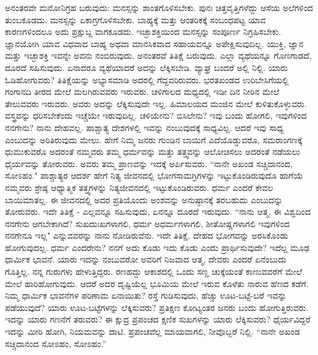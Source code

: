 ಅನಂತರವೇ ಮನೋನಿಗ್ರಹ ಬರುವುದು: ಮನಸ್ಸನ್ನು ಶಾಂತಗೊಳಿಸಬೇಕು. ಪುನಃ ಚಿತ್ತವೃತ್ತಿಗಳೆದ್ದು ಆಸೆಯ ಅಲೆಗಳಿಂದ ತುಂಬಕೂಡದು. ಮನಸ್ಸನ್ನು ಏಕಾಗ್ರಗೊಳಿಸಬೇಕು. ಬಾಹ್ಯಕ್ಕೆ ಮತ್ತು ಆಂತರಿಕಕ್ಕೆ ಸಂಬಂಧಪಟ್ಟ ಯಾವ ಕಾರಣಗಳಿಂದಲೂ ಅದು ಪ್ರಕ್ಷುಬ್ದ ವಾಗಕೂಡದು. ಇಚ್ಛಾಶಕ್ತಿಯಿಂದ ಮನಸ್ಸನ್ನು ಸಂಪೂರ್ಣ ನಿಗ್ರಹಿಸಬೇಕು. ಜ್ಞಾನಯೋಗಿ ಯಾವ ವಿಧವಾದ ಬಾಹ್ಯ ಅಥವಾ ಮಾನಸಿಕವಾದ ಸಹಾಯವನ್ನೂ ಅಪೇಕ್ಷಿಸುವುದಿಲ್ಲ. ಯುಕ್ತಿ, ಜ್ಞಾನ ಮತ್ತು ಇಚ್ಛಾಶಕ್ತಿ ಇವನ್ನೇ ಅವನು ನಂಬಿರುವುದು. ಅನಂತರವೆ ತಿತಿಕ್ಷೆ ಬರುವುದು. ಎಲ್ಲಾ ವ್ಯಥೆಯನ್ನೂ ಗೊಣಗಾಡದೆ, ದೂರದೆ ಸಹಿಸುವುದು. ಏನಾದರೂ ವ್ಯಥೆಯಾದರೆ ಅದನ್ನು ಲೆಕ್ಕಿಸಬೇಡಿ. ವ್ಯಾಘ್ರ ಬಂದರೆ ಅಲ್ಲಿ ನಿಲ್ಲಿ. ಯಾರು ಓಡಿಹೋಗುವರು? ತಿತಿಕ್ಷೆಯನ್ನು ಅಭ್ಯಾಸಮಾಡಿ ಅದರಲ್ಲಿ ಗೆದ್ದವರಿರುವರು. ಭರತಖಂಡದ ಉರಿಬೇಸಿಗೆಯಲ್ಲಿ ಗಂಗಾನದಿ ತೀರದ ಮೇಲೆ ಮಲಗಿರುವವರು ಇರುವರು. ಚಳಿಗಾಲದ ಮಧ್ಯದಲ್ಲಿ ಇಡೀ ದಿನ ನೀರಿನ ಮೇಲೆ ತೇಲುವವರು ಇರುವರು. ಅವರು ಅದನ್ನು ಲೆಕ್ಕಿಸುವುದೇ ಇಲ್ಲ. ಹಿಮಾಲಯದ ಮಂಜಿನ ಮೇಲೆ ಕುಳಿತುಕೊಳ್ಳುವರು. ವಸ್ತ್ರವನ್ನು ಧರಿಸಬೇಕೆಂದು ಇಚ್ಚೆಯೇ ಇರುವುದಿಲ್ಲ. ಚಳಿಯೇನು? ಬಿಸಿಲೇನು? ಇವು ಬಂದು ಹೋಗಲಿ, ಇವುಗಳಿಂದ ನನಗೇನು? ನಾನು ದೇಹವಲ್ಲ. ಪಾಶ್ಚಾತ್ಯ ದೇಶಗಳಲ್ಲಿ ಇವನ್ನು ನಂಬುವುದಕ್ಕೆ ಸಾಧ್ಯವಿಲ್ಲ. ಆದರೆ ಇವು ಸಾಧ್ಯ ಎಂಬುದನ್ನು ಅರಿತಿರುವುದು ಮೇಲು. ಹೇಗೆ ನಿಮ್ಮ ಜನರು ಗುಂಡಿನ ಬಾಯಿಗೆ ಎದೆಯೊಡ್ಡುವರೊ, ಸಮರಾಂಗಣಕ್ಕೆ ಧುಮುಕುವರೊ ಅದರಂತೆ ನಮ್ಮವರು ತಮ್ಮ ಧರ್ಮವನ್ನು ಮತ್ತು ತತ್ತ್ವವನ್ನು ಆಲೋಚಿಸಲು ಅದರಂತೆ ನಡೆಯಲು ಧೈರ್ಯವನ್ನು ತೋರುವರು. ಅವರು ತಮ್ಮ ಪ್ರಾಣವನ್ನು ಇದಕ್ಕೆ ಅರ್ಪಿಸುವರು. “ನಾನೇ ಅಖಂಡ ಸಚ್ಚಿದಾನಂದ, ಸೋಽಹಂ." ಪಾಶ್ಚಾತ್ಯರ ಆದರ್ಶ ಹೇಗೆ ನಿತ್ಯ ಜೀವನದಲ್ಲಿ ಭೋಗಸಾಮಗ್ರಿಗಳನ್ನು ಇಟ್ಟುಕೊಂಡಿರುವುದೊ ಹಾಗೆಯೆ ನಮ್ಮವರು ಶ್ರೇಷ್ಠ ಆಧ್ಯಾತ್ಮಿಕ ತತ್ತ್ವಗಳನ್ನು ನಿತ್ಯಜೀವನದಲ್ಲಿ ಇಟ್ಟುಕೊಂಡಿರುವರು. ಧರ್ಮ ಎಂದರೆ ಕೇವಲ ಬಾಯಿಮಾತಲ್ಲ. ಈ ಜೀವನದಲ್ಲಿ ಅದರ ಪ್ರತಿಯೊಂದು ಅಂಶವನ್ನು ಅನುಷ್ಠಾನಕ್ಕೆ ತರಬಹುದು ಎಂಬುದನ್ನು ತೋರುವರು. ಇದೇ ತಿತಿಕ್ಷೆ - ಎಲ್ಲವನ್ನೂ ಸಹಿಸುವುದು, ಏನನ್ನೂ ದೂರದೆ ಇರುವುದು. “ನಾನು ಆತ್ಮ. ಈ ವಿಶ್ವದಿಂದ ನನಗೇನು ಆಗಬೇಕಾಗಿದೆ? ಸುಖದುಃಖಗಳಾಗಲಿ, ಧರ್ಮ ಅಧರ್ಮಗಳಾಗಲಿ, ಶೀತೋಷ್ಣಗಳಾಗಲಿ ಇವುಗಳಿಂದ ನನಗೇನೂ ಇಲ್ಲ" ಎನ್ನುವವರನ್ನು ನಾನು ನೋಡಿರುವೆನು. ಇದೇ ತಿತಿಕ್ಷೆ. ದೇಹದ ಭೋಗವನ್ನು ಅರಸಿಕೊಂಡು ಹೋಗುವುದಲ್ಲ. ಧರ್ಮ ಎಂದರೇನು? ನನಗೆ ಅದು ಕೊಡು ಇದು ಕೊಡು ಎಂದು ಪ್ರಾರ್ಥಿಸುವುದೇ? ಇದೆಲ್ಲ ಮೂಢ ಧಾರ್ಮಿಕ ಭಾವನೆ. ಯಾರು ಇದನ್ನು ನಂಬುವರೋ ಅವರಿಗೆ ನಿಜವಾದ ಆತ್ಮ, ದೇವರು ಎಂದರೆ ಏನೆಂಬುದು ಗೊತ್ತಿಲ್ಲ. ನನ್ನ ಗುರುಗಳು ಹೇಳುತ್ತಿದ್ದರು. ರಣಹದ್ದು ಆಕಾಶದಲ್ಲಿ ಒಂದು ಸಣ್ಣ ಚುಕ್ಕೆಯಂತೆ ಕಾಣುವವರೆಗೆ ಮೇಲೆ ಮೇಲೆ ಹಾರಿಹೋಗುವುದು. ಆದರೆ ಅದರ ದೃಷ್ಟಿಯೆಲ್ಲ ಭೂಮಿಯ ಮೇಲೆ ಇರುವ ಕೊಳೆತು ನಾರುವ ಹೆಣದ ಕಡೆಗೆ. ನಿಮ್ಮ ಧಾರ್ಮಿಕ ಭಾವನೆಗಳ ಪರಿಣಾಮ ಏನಾಯಿತು? ರಸ್ತೆ ಗುಡಿಸುವುದು, ಹೆಚ್ಚು ಊಟ-ಬಟ್ಟೆ-ಬರೆ ಇವನ್ನು ಪಡೆಯುವುದೆ? ಯಾರು ಊಟ-ಬಟ್ಟೆಗಳನ್ನು ಲೆಕ್ಕಿಸುವರು? ಪ್ರತಿಕ್ಷಣ ಕೋಟ್ಯಂತರ ಜನರು ಬಂದು ಹೋಗುತ್ತಿರುವರು. ಇದನ್ನು ಯಾರು ಗಣನೆಗೆ ತರುವರು? ಈ ಕ್ಷುದ್ರ ಪ್ರಪಂಚದ ಕ್ಷಣಿಕ ಸುಖಗಳನ್ನು ಯಾರು ಲೆಕ್ಕಿಸುವರು? ಧೈರ್ಯವಿದ್ದರೆ ಇದನ್ನು ಮೀರಿ ಹೋಗಿ, ನಿಯಮವನ್ನು ದಾಟಿ. ಪ್ರಪಂಚವೆಲ್ಲ ಮಾಯವಾಗಲಿ, ನೀವೊಬ್ಬರೆ ನಿಲ್ಲಿ. “ನಾನೇ ಅಖಂಡ ಸಚ್ಚಿದಾನಂದ ಸೋಽಹಂ, ಸೋಽಹಂ.”

